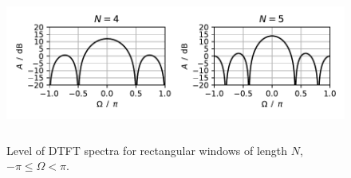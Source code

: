 \documentclass[11pt,a4paper,DIV=12]{scrartcl}
\begin{document}
\begin{figure}
		\centering
		\includegraphics[width=6in, height=2in]{graphics/RectWindow_DTFT_DFT_log_sym.pdf}
		\caption{Level of DTFT spectra for rectangular windows of length $N$,
		$-\pi\leq\Omega<\pi$.}
		\label{RectWindow_DTFT_log_sym}
\end{figure}

\end{document}
